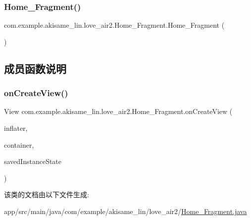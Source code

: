 \subsubsection{\texorpdfstring{Home\_Fragment()}{Home\_Fragment()}}
{\footnotesize\ttfamily com.\+example.\+akisame\+\_\+lin.\+love\+\_\+air2.\+Home\+\_\+\+Fragment.\+Home\+\_\+\+Fragment (\begin{DoxyParamCaption}{ }\end{DoxyParamCaption})\hspace{0.3cm}{\ttfamily [inline]}}



\subsection{成员函数说明}
\mbox{\label{classcom_1_1example_1_1akisame__lin_1_1love__air2_1_1_home___fragment_a4e1184066d5cae9007dc4b9e342536d2}} 
\subsubsection{\texorpdfstring{onCreateView()}{onCreateView()}}
{\footnotesize\ttfamily View com.\+example.\+akisame\+\_\+lin.\+love\+\_\+air2.\+Home\+\_\+\+Fragment.\+on\+Create\+View (\begin{DoxyParamCaption}\item[{Layout\+Inflater}]{inflater,  }\item[{View\+Group}]{container,  }\item[{Bundle}]{saved\+Instance\+State }\end{DoxyParamCaption})\hspace{0.3cm}{\ttfamily [inline]}}



该类的文档由以下文件生成\+:\begin{DoxyCompactItemize}
\item 
app/src/main/java/com/example/akisame\+\_\+lin/love\+\_\+air2/\mbox{\hyperlink{_home___fragment_8java}{Home\+\_\+\+Fragment.\+java}}\end{DoxyCompactItemize}
